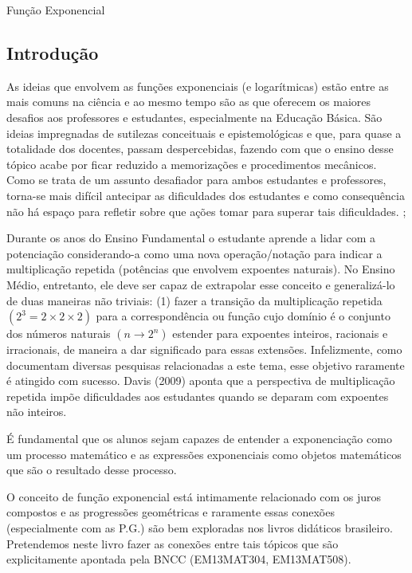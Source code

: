 \begin{apresentacao}{Função Exponencial}

\subsection{Introdução}
As ideias que envolvem as funções exponenciais (e logarítmicas) estão entre as mais comuns na ciência e ao mesmo tempo são as que oferecem os maiores desafios aos professores e estudantes, especialmente na Educação Básica. São ideias impregnadas de sutilezas conceituais e epistemológicas e que, para quase a totalidade dos docentes, passam despercebidas, fazendo com que o ensino desse tópico acabe por ficar reduzido a memorizações e procedimentos mecânicos. Como se trata de um assunto desafiador para ambos estudantes e professores, torna-se mais difícil antecipar as dificuldades dos estudantes e como consequência não há espaço para refletir sobre que ações tomar para superar tais dificuldades. \citep{Davis2009}; \citep{Weber2002}

Durante os anos do Ensino Fundamental o estudante aprende a lidar com a potenciação considerando-a como uma nova operação/notação para indicar a multiplicação repetida (potências que envolvem expoentes naturais). No Ensino Médio, entretanto, ele deve ser capaz de extrapolar esse conceito e generalizá-lo de duas maneiras não triviais: (1) fazer a transição da multiplicação repetida $(2^{3}=2 \times 2 \times 2 )$ para a correspondência ou função cujo domínio é o conjunto dos números naturais $(n \longrightarrow 2^{n})$ estender para expoentes inteiros, racionais e irracionais, de maneira a dar significado para essas extensões. Infelizmente, como documentam diversas pesquisas relacionadas a este tema, esse objetivo raramente é atingido com sucesso.  Davis (2009) aponta que a perspectiva de multiplicação repetida impõe dificuldades aos estudantes quando se deparam com expoentes não inteiros.

É fundamental que os alunos sejam capazes de entender a exponenciação como um processo matemático e as expressões exponenciais como objetos matemáticos que são o resultado desse processo. \citep{Weber2002}

O conceito de função exponencial está intimamente relacionado com os juros compostos e as progressões geométricas e raramente essas conexões (especialmente com as P.G.) são bem exploradas nos livros didáticos brasileiro. Pretendemos neste livro fazer as conexões entre tais tópicos que são explicitamente apontada pela BNCC \citep{BNCC2018} (EM13MAT304, EM13MAT508). 


\end{apresentacao}
